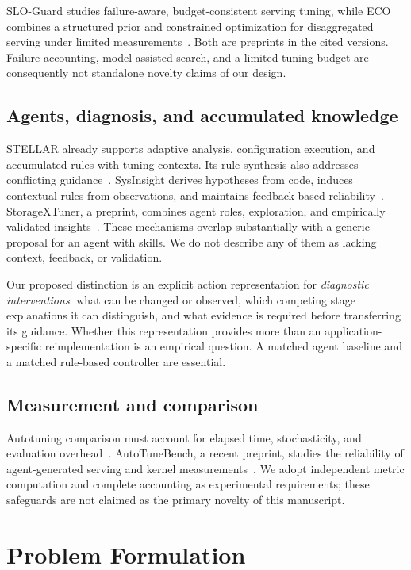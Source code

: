 \documentclass[11pt,a4paper]{article}
\begin{document}
SLO-Guard studies failure-aware, budget-consistent serving tuning, while ECO combines a structured prior and constrained optimization for disaggregated serving under limited measurements~\cite{sloguard2026,ecotuning2026}. Both are preprints in the cited versions. Failure accounting, model-assisted search, and a limited tuning budget are consequently not standalone novelty claims of our design.

\subsection{Agents, diagnosis, and accumulated knowledge}
STELLAR already supports adaptive analysis, configuration execution, and accumulated rules with tuning contexts. Its rule synthesis also addresses conflicting guidance~\cite{stellar2025}. SysInsight derives hypotheses from code, induces contextual rules from observations, and maintains feedback-based reliability~\cite{sysinsight2026}. StorageXTuner, a preprint, combines agent roles, exploration, and empirically validated insights~\cite{storagextuner2025}. These mechanisms overlap substantially with a generic proposal for an agent with skills. We do not describe any of them as lacking context, feedback, or validation.

Our proposed distinction is an explicit action representation for \emph{diagnostic interventions}: what can be changed or observed, which competing stage explanations it can distinguish, and what evidence is required before transferring its guidance. Whether this representation provides more than an application-specific reimplementation is an empirical question. A matched agent baseline and a matched rule-based controller are essential.

\subsection{Measurement and comparison}
Autotuning comparison must account for elapsed time, stochasticity, and evaluation overhead~\cite{methodology2024}. AutoTuneBench, a recent preprint, studies the reliability of agent-generated serving and kernel measurements~\cite{autotunebench2026}. We adopt independent metric computation and complete accounting as experimental requirements; these safeguards are not claimed as the primary novelty of this manuscript.

\section{Problem Formulation}
\end{document}
